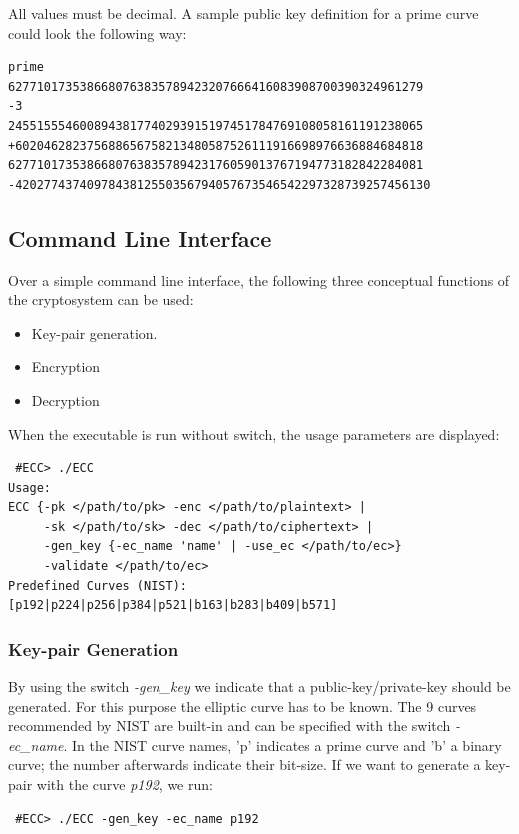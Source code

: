 \documentclass[11pt,english]{article}
\begin{document}
All values must be decimal. A sample public key definition for a prime curve could look the following way:

\begin{verbatim}
prime
6277101735386680763835789423207666416083908700390324961279
-3
2455155546008943817740293915197451784769108058161191238065
+602046282375688656758213480587526111916698976636884684818
6277101735386680763835789423176059013767194773182842284081
-4202774374097843812550356794057673546542297328739257456130
\end{verbatim}


\subsection{Command Line Interface}
Over a simple command line interface, the following three conceptual functions of the cryptosystem can be used:
\begin{itemize}
 \item Key-pair generation.
 \item Encryption
 \item Decryption
\end{itemize}

When the executable is run without switch, the usage parameters are displayed:

\begin{verbatim}
 #ECC> ./ECC
Usage:
ECC {-pk </path/to/pk> -enc </path/to/plaintext> |
     -sk </path/to/sk> -dec </path/to/ciphertext> |
     -gen_key {-ec_name 'name' | -use_ec </path/to/ec>}
     -validate </path/to/ec>
Predefined Curves (NIST): [p192|p224|p256|p384|p521|b163|b283|b409|b571]
\end{verbatim}

\subsubsection{Key-pair Generation}
By using the switch \emph{-gen\_key} we indicate that a public-key/private-key should be generated. For this purpose the elliptic curve has to be known. The 9 curves recommended by NIST are built-in and can be specified with the switch \emph{-ec\_name}. In the NIST curve names, 'p' indicates a prime curve and 'b' a binary curve; the number afterwards indicate their bit-size. If we want to generate a key-pair with the curve \emph{p192}, we run:

\begin{verbatim}
 #ECC> ./ECC -gen_key -ec_name p192
\end{verbatim}
\end{document}
